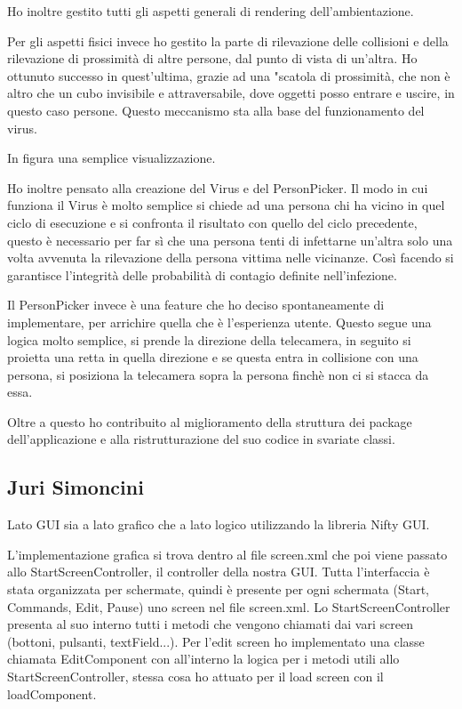 Ho inoltre gestito tutti gli aspetti generali di rendering dell'ambientazione.

Per gli aspetti fisici invece ho gestito la parte di rilevazione delle collisioni e della rilevazione di prossimità di altre persone, dal punto di vista di un'altra.
Ho ottunuto successo in quest'ultima, grazie ad una "scatola di prossimità, che non è altro che un cubo invisibile e attraversabile, dove oggetti posso entrare e uscire, in questo caso persone.
Questo meccanismo sta alla base del funzionamento del virus.

In figura una semplice visualizzazione.

Ho inoltre pensato alla creazione del Virus e del PersonPicker.
Il modo in cui funziona il Virus è molto semplice si chiede ad una persona chi ha vicino in quel ciclo di esecuzione e si confronta il risultato con quello del ciclo precedente, questo è necessario per far sì che una persona tenti di infettarne un'altra solo una volta avvenuta la rilevazione della persona vittima nelle vicinanze.
Così facendo si garantisce l'integrità delle probabilità di contagio definite nell'infezione.

Il PersonPicker invece è una feature che ho deciso spontaneamente di implementare, per arrichire quella che è l'esperienza utente.
Questo segue una logica molto semplice, si prende la direzione della telecamera, in seguito si proietta una retta in quella direzione e se questa entra in collisione con una persona, si posiziona la telecamera sopra la persona finchè non ci si stacca da essa.

Oltre a questo ho contribuito al miglioramento della struttura dei package dell'applicazione e alla ristrutturazione del suo codice in svariate classi.

\subsection{Juri Simoncini}
Lato GUI sia a lato grafico che a lato logico utilizzando la libreria Nifty GUI.

L'implementazione grafica si trova dentro al file screen.xml che poi viene passato allo StartScreenController, il controller della nostra GUI.
Tutta l'interfaccia è stata organizzata per schermate, quindi è presente per ogni schermata (Start, Commands, Edit, Pause) uno screen nel file screen.xml.
Lo StartScreenController presenta al suo interno tutti i metodi che vengono chiamati dai vari screen (bottoni, pulsanti, textField...).
Per l'edit screen ho implementato una classe chiamata EditComponent con all'interno la logica per i metodi utili allo StartScreenController, stessa cosa ho attuato per il load screen con il loadComponent.

